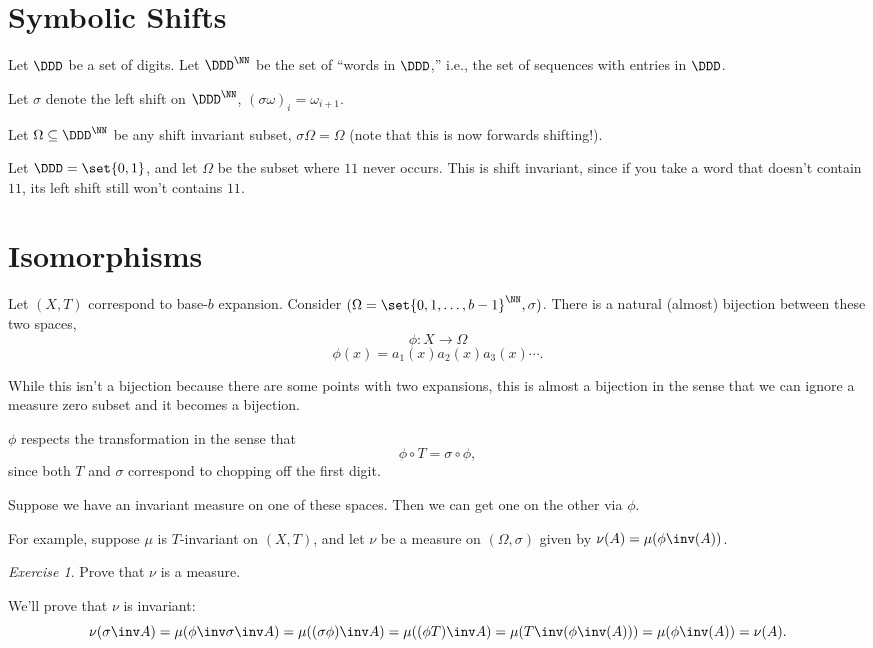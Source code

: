 \documentclass{article}
\theoremstyle{remark}
\newtheorem{exercise}{Exercise}
\begin{document}
\section{Symbolic Shifts}

Let $\DDD$ be a set of digits. Let $\DDD^\NN$
be the set of ``words in $\DDD$,''
i.e., the set of sequences with entries in $\DDD$.

Let $\sigma$ denote the left shift on $\DDD^\NN$,
$(\sigma\omega)_i = \omega_{i+1}$.

Let $\Omega \subseteq \DDD^\NN$ be any shift invariant
subset, $\sigma \Omega = \Omega$ (note that this is now
forwards shifting!). 

Let $\DDD=\set{0,1}$, and let 
$\Omega$ be the subset where $11$ never occurs.
This is shift invariant, since if you take a word
that doesn't contain $11$, its left shift still won't
contains $11$.

\section{Isomorphisms}

Let $(X,T)$ correspond to base-$b$ expansion.
Consider $(\Omega=\set{0,1,\ldots,b-1}^\NN,\sigma)$.
There is a natural (almost) bijection between these 
two spaces,
\[ \phi:X\to\Omega \]
\[ \phi(x) = a_1(x)a_2(x)a_3(x)\cdots. \]

While this isn't a bijection because there are some 
points with two expansions, this is almost a bijection
in the sense that we can ignore a measure zero subset
and it becomes a bijection.

$\phi$ respects the transformation in the sense that
\[ \phi\circ T = \sigma \circ \phi, \]
since both $T$ and $\sigma$ correspond to chopping
off the first digit.

Suppose we have an invariant measure on one of these 
spaces. Then we can get one on the other via
$\phi$.

For example, suppose $\mu$ is $T$-invariant on $(X,T)$,
and let $\nu$ be a measure on $(\Omega,\sigma)$ given
by $\nu(A) = \mu(\phi\inv(A))$.

\begin{exercise}
    Prove that $\nu$ is a measure.
\end{exercise}

We'll prove that $\nu$ is invariant:
\[ \nu(\sigma\inv A) = \mu(\phi\inv \sigma\inv A)
= \mu((\sigma\phi)\inv A)
= \mu((\phi T)\inv A)
= \mu(T\inv(\phi\inv(A)))
=\mu(\phi\inv(A))
=\nu(A).
\]
\end{document}
